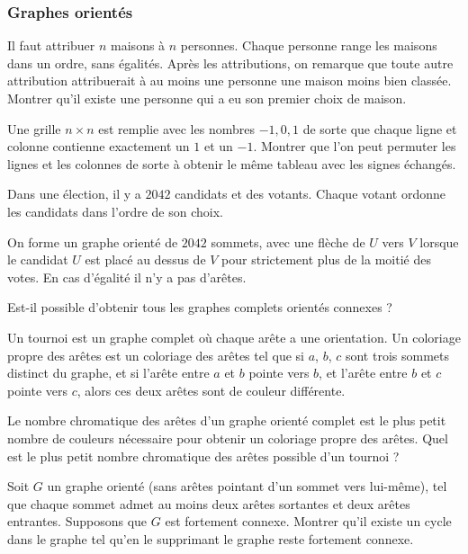 \subsubsection{Graphes orientés}


\begin{exo}
Il faut attribuer $n$ maisons à $n$ personnes. Chaque personne range les maisons dans un ordre, sans égalités. Après les attributions, on remarque que toute autre attribution attribuerait à au moins une personne une maison moins bien classée. Montrer qu'il existe une personne qui a eu son premier choix de maison.
\end{exo}


\begin{exo}
Une grille $n\times n$ est remplie avec les nombres $-1, 0, 1$ de sorte que chaque ligne et colonne contienne exactement un $1$ et un $-1$. Montrer que l'on peut permuter les lignes et les colonnes de sorte à obtenir le même tableau avec les signes échangés.
\end{exo}


\begin{exo}
Dans une élection, il y a $2042$ candidats et des votants. Chaque votant ordonne les candidats dans l'ordre de son choix.

On forme un graphe orienté de $2042$ sommets, avec une flèche de $U$ vers $V$ lorsque le candidat $U$ est placé au dessus de $V$ pour strictement plus de la moitié des votes. En cas d'égalité il n'y a pas d'arêtes.

Est-il possible d'obtenir tous les graphes complets orientés connexes ?
\end{exo}


\begin{exo}
Un tournoi est un graphe complet où chaque arête a une orientation. Un coloriage propre des arêtes est un coloriage des arêtes tel que si $a$, $b$, $c$ sont trois sommets distinct du graphe, et si l'arête entre $a$ et $b$ pointe vers $b$, et l'arête entre $b$ et $c$ pointe vers $c$, alors ces deux arêtes sont de couleur différente.

Le nombre chromatique des arêtes d'un graphe orienté complet est le plus petit nombre de couleurs nécessaire pour obtenir un coloriage propre des arêtes. Quel est le plus petit nombre chromatique des arêtes possible d'un tournoi ?
\end{exo}

\begin{exo}%
Soit $G$ un graphe orienté (sans arêtes pointant d'un sommet vers lui-même), tel que chaque sommet admet au moins deux arêtes sortantes et deux arêtes entrantes. Supposons que $G$ est fortement connexe. Montrer qu'il existe un cycle dans le graphe tel qu'en le supprimant le graphe reste fortement connexe.
\end{exo}


